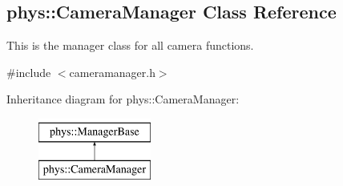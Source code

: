 \hypertarget{classphys_1_1CameraManager}{
\subsection{phys::CameraManager Class Reference}
\label{d9/d91/classphys_1_1CameraManager}
}


This is the manager class for all camera functions.  




{\ttfamily \#include $<$cameramanager.h$>$}

Inheritance diagram for phys::CameraManager:\begin{figure}[H]
\begin{center}
\leavevmode
\includegraphics[height=2.000000cm]{d9/d91/classphys_1_1CameraManager}
\end{center}
\end{figure}

